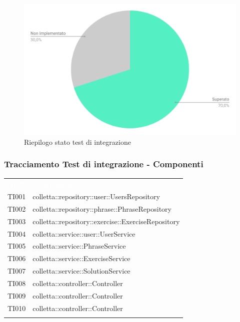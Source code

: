 \begin{figure}[H]
	\centering
	\includegraphics[width=0.7\linewidth]{sez/test/img/statoTestIntegrazione.pdf}
	\caption{Riepilogo stato test di integrazione}
\end{figure}

\subsubsection{Tracciamento Test di integrazione - Componenti}

\begin{tabularx}{\textwidth}{cX}
	
	\rowcolor{greySWEight}
	
	\rowcolor{greySWEight}
	\textcolor{white}{\textbf{Test}} & 
	\textcolor{white}{\textbf{Componenti}} \\
	
	TI001 & colletta::repository::user::UsersRepository \\
	TI002 & colletta::repository::phrase::PhraseRepository \\
	TI003 & colletta::repository::exercise::ExerciseRepository \\
	TI004 & colletta::service::user::UserService \\
	TI005 & colletta::service::PhraseService \\
	TI006 & colletta::service::ExerciseService \\
	TI007 & colletta::service::SolutionService \\
	TI008 & colletta::controller::Controller \\
	TI009 & colletta::controller::Controller \\
	TI010 & colletta::controller::Controller \\
	
	\rowcolor{white}
	\caption{Tracciamento test di integrazione - componenti}
	\label{tab:tracciamentotestintegrazione}
\end{tabularx}
